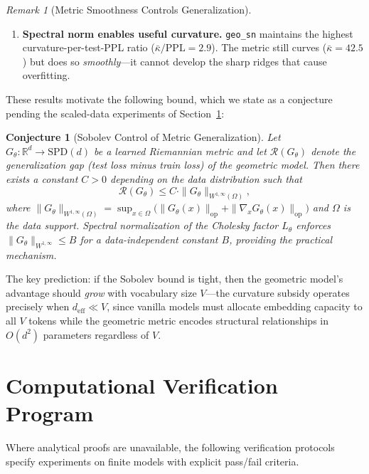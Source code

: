 \documentclass[11pt,a4paper]{article}
\newtheorem{conjecture}[theorem]{Conjecture}
\theoremstyle{definition}
\theoremstyle{remark}
\newtheorem{remark}[theorem]{Remark}
\newcommand{\R}{\mathbb{R}}
\begin{document}
\begin{remark}[Metric Smoothness Controls Generalization]
\begin{enumerate}[nosep]
\item \textbf{Spectral norm enables useful curvature.} 
\texttt{geo\_sn} maintains the highest curvature-per-test-PPL 
ratio ($\bar\kappa / \mathrm{PPL} = 2.9$). The metric still 
curves ($\bar\kappa = 42.5$) but does so \emph{smoothly}---it 
cannot develop the sharp ridges that cause overfitting.
\end{enumerate}

These results motivate the following bound, which we state as a 
conjecture pending the scaled-data experiments of 
Section~\ref{sec:verification}:
\end{remark}

\begin{conjecture}[Sobolev Control of Metric Generalization]%
\label{conj:sobolev_metric}
Let $G_\theta : \R^d \to \mathrm{SPD}(d)$ be a learned Riemannian 
metric and let $\mathcal{R}(G_\theta)$ denote the generalization 
gap (test loss minus train loss) of the geometric model. Then there 
exists a constant $C > 0$ depending on the data distribution such 
that
\[
    \mathcal{R}(G_\theta) \leq C \cdot 
    \|G_\theta\|_{W^{1,\infty}(\Omega)},
\]
where $\|G_\theta\|_{W^{1,\infty}(\Omega)} = 
\sup_{x \in \Omega} \bigl(\|G_\theta(x)\|_{\mathrm{op}} + 
\|\nabla_x G_\theta(x)\|_{\mathrm{op}}\bigr)$ and $\Omega$ is 
the data support. Spectral normalization of the Cholesky factor 
$L_\theta$ enforces $\|G_\theta\|_{W^{1,\infty}} \leq B$ for a 
data-independent constant $B$, providing the practical mechanism.
\end{conjecture}

The key prediction: if the Sobolev bound is tight, then the 
geometric model's advantage should \emph{grow} with vocabulary 
size $V$—the curvature subsidy operates precisely when 
$d_{\mathrm{eff}} \ll V$, since vanilla models must allocate 
embedding capacity to all $V$ tokens while the geometric metric 
encodes structural relationships in $O(d^2)$ parameters regardless 
of $V$.


\section{Computational Verification Program}\label{sec:verification}

Where analytical proofs are unavailable, the following verification 
protocols specify experiments on finite models with explicit 
pass/fail criteria.
\end{document}
